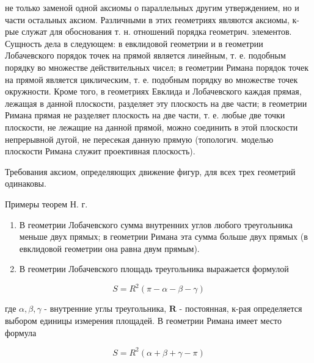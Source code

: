 \documentclass[10pt]{article}
\begin{document}
не только заменой одной аксиомы о параллельных другим утверждением, но и части остальных аксиом. Различными в этих геометриях являются аксиомы, к-рые служат для обоснования т. н. отношений порядка геометрич. элементов. Сущность дела в следующем: в евклидовой геометрии и в геометрии Лобачевского порядок точек на прямой является линейным, т. е. подобным порядку во множестве действительных чисел; в геометрии Римана порядок точек на прямой является циклическим, т. е. подобным порядку во множестве точек окружности. Кроме того, в геометриях Евклида и Лобачевского каждая прямая, лежащая в данной плоскости, разделяет эту плоскость на две части; в геометрии Римана прямая не разделяет плоскость на две части, т. е. любые две точки плоскости, не лежащие на данной прямой, можно соединить в этой плоскости непрерывной дугой, не пересекая данную прямую (топологич. моделью плоскости Римана служит проективная плоскость).



Требования аксиом, определяющих движение фигур, для всех трех геометрий одинаковы.



Примеры теорем Н. г.



\begin{enumerate}

  \item В геометрии Лобачевского сумма внутренних углов любого треугольника меньше двух прямых; в геометрии Римана эта сумма больше двух прямых (в евклидовой геометрии она равна двум прямым).



  \item В геометрии Лобачевского площадь треугольника выражается формулой



\end{enumerate}



\[

S=R^{2}(\pi-\alpha-\beta-\gamma)

\]



где $\alpha, \beta, \gamma$ - внутренние углы треугольника, $\boldsymbol{R}$ - постоянная, к-рая определяется выбором единицы измерения площадей. В геометрии Римана имеет место формула



\[

S=R^{2}(\alpha+\beta+\gamma-\pi)

\]
\end{document}

